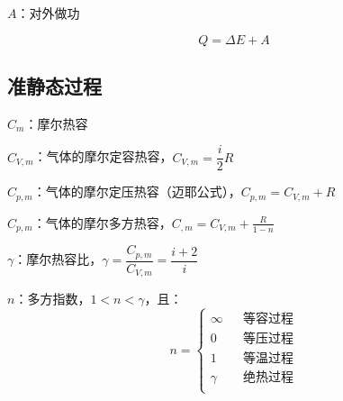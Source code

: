 \documentclass{article}
\begin{document}
$A$：对外做功

\[Q=\Delta E+A\]

\subsection{准静态过程}

$C_m$：摩尔热容

$C_{V,m}$：气体的摩尔定容热容，$C_{V,m}=\dfrac i2R$

$C_{p,m}$：气体的摩尔定压热容（迈耶公式），$C_{p,m}=C_{V,m}+R$

$C_{p,m}$：气体的摩尔多方热容，$C_{,m}=C_{V,m}+\frac R{1-n}$

$\gamma$：摩尔热容比，$\gamma=\dfrac{C_{p,m}}{C_{V,m}}=\dfrac{i+2}i$

$n$：多方指数，$1<n<\gamma$，且：
\[n=\left\{\begin{aligned}
        \infty &  & \text{等容过程} \\
        0      &  & \text{等压过程} \\
        1      &  & \text{等温过程} \\
        \gamma &  & \text{绝热过程} \\
    \end{aligned}\right.\]
\end{document}
